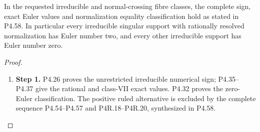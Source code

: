 \begin{proposition}[P4.9]\hypertarget{tag-02Y1}{}\label{night:P4.9}\label{stmt:P4.9}

In the requested irreducible and normal-crossing fibre classes,
the complete sign, exact Euler values and normalization equality
classification hold as stated in P4.58. In particular every
irreducible singular support with rationally resolved normalization
has Euler number two, and every other irreducible support has
Euler number zero.
\end{proposition}
\begin{proof}
\begin{enumerate}[label={$\langle1\rangle$\arabic*.},leftmargin=*]
\item 
\noindent\textbf{Step 1.} P4.26 proves the unrestricted irreducible numerical sign;
P4.35--P4.37 give the rational and class-VII exact values.
P4.32 proves the zero-Euler classification. The positive ruled
alternative is excluded by the complete sequence P4.54--P4.57
and P4R.18--P4R.20, synthesized in P4.58.

\end{enumerate}
\end{proof}
